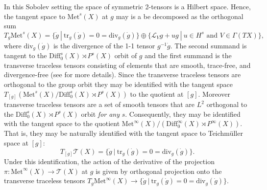 In this Sobolev setting the space of symmetric 2-tensors is a Hilbert space. Hence, the tangent space to $\mathrm{Met}^s(X)$ at $g$ may is a be decomposed as the orthogonal sum
\[
T_g \mathrm{Met}^s(X) = \{\dot{g} \ | \ \mathrm{tr}_g (\dot{g}) = 0 = \mathrm{div}_g(\dot{g}) \} \oplus \{\mathcal{L}_V g + u g \ |\ u \in H^s \text{ and } V \in \Gamma(TX) \},
\] 
where $\mathrm{div}_g(\dot{g})$ is the divergence of the 1-1 tensor $g^{-1}\dot{g}$. 
The second summand is tangent to the $\mathrm{Diff}_0^s(X) \rtimes P^s(X)$ orbit of $g$ and the first summand is the transverse traceless tensors consisting of elements that are smooth, trace-free, and divergence-free (see \cite{fischer-marsden1975} for more details). 
Since the transverse traceless tensors are orthogonal to the group orbit they may be identified with the tangent space $T_{[g]} \left( \mathrm{Met}^s(X)/ \mathrm{Diff}_0^s(X) \rtimes P^s(X) \right)$ to the quotient at $[g]$. 
Moreover transverse traceless tensors are a set of smooth tensors that are $L^2$ orthogonal to the $\mathrm{Diff}_0^s(X) \rtimes P^s(X)$ orbit \textit{for any} $s$. 
Consequently, they may be identified with the tangent space to the quotient $\mathrm{Met}^\infty(X)/(\mathrm{Diff}_0^\infty(X) \rtimes P^\infty(X))$. 
That is, they may be naturally identified with the tangent space to Teichm\"uller space at $[g]$:
\[
T_{[g]} \mathcal{T}(X) = \{\dot{g} \ | \ \mathrm{tr}_g (\dot{g}) = 0 = \mathrm{div}_g(\dot{g}) \}.
\]
Under this identification, the action of the derivative of the projection $\pi: \mathrm{Met}^\infty(X) \to \mathcal{T}(X)$ at $g$ is given by orthogonal projection onto the transverse traceless tensors $T_g \mathrm{Met}^\infty(X) \to \{\dot{g} \ | \ \mathrm{tr}_g (\dot{g}) = 0 = \mathrm{div}_g(\dot{g}) \}$.

